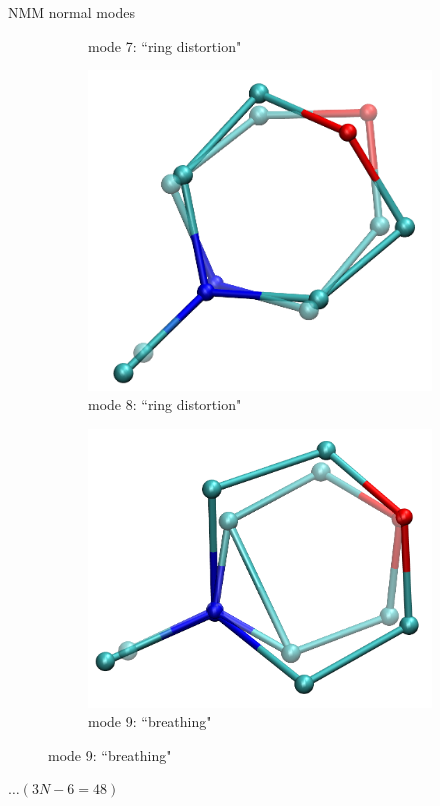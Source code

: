 \documentclass{beamer}
\begin{document}
\begin{frame}{NMM normal modes}
\begin{figure}
\begin{subfigure}{\x\textwidth}
			\caption{mode 7: ``ring distortion"}
		\end{subfigure}
		\begin{subfigure}{\x\textwidth}
			\includegraphics[width=\textwidth]{mode8_ot.png}
			\caption{mode 8: ``ring distortion"}
		\end{subfigure}
		\begin{subfigure}{\x\textwidth}
			\includegraphics[width=\textwidth]{mode9_ot.png}
			\caption{mode 9: ``breathing"}
		\end{subfigure}
	\end{figure}
	$\dots (3N - 6 = 48)$
\end{frame}
\end{document}

